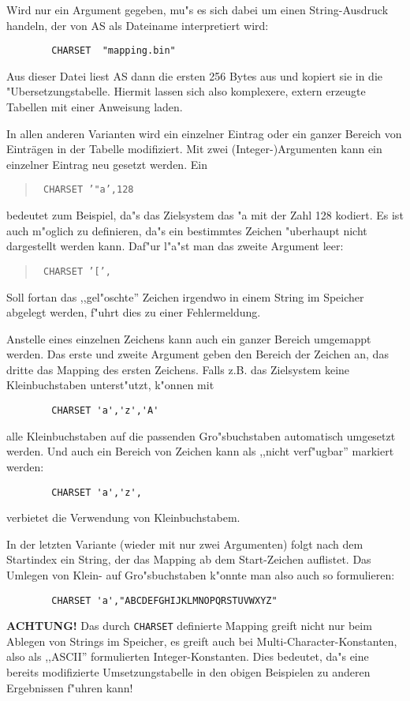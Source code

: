 \documentclass[12pt,a4paper,twoside]{report}
\newcommand{\bb}[1]{{\bf #1}}
\newcommand{\tty}[1]{{\tt #1}}
\begin{document}
Wird nur ein Argument gegeben, mu"s es sich dabei um einen String-Ausdruck
handeln, der von AS als Dateiname interpretiert wird:
\begin{verbatim}
        CHARSET  "mapping.bin"
\end{verbatim}
Aus dieser Datei liest AS dann die ersten 256 Bytes aus und kopiert sie in die
"Ubersetzungstabelle.  Hiermit lassen sich also komplexere, extern
erzeugte Tabellen mit einer Anweisung laden.

In allen anderen Varianten wird ein einzelner Eintrag oder ein ganzer
Bereich von Einträgen in der Tabelle modifiziert.  Mit zwei (Integer-)Argumenten
kann ein einzelner Eintrag neu gesetzt werden.  Ein
\begin{quote}{\tt
        CHARSET '"a',128
}\end{quote}
bedeutet zum Beispiel, da"s das Zielsystem das "a mit der Zahl 128 kodiert.
Es ist auch m"oglich zu definieren, da"s ein bestimmtes Zeichen "uberhaupt
nicht dargestellt werden kann.  Daf"ur l"a"st man das zweite Argument leer:
\begin{quote}{\tt
        CHARSET '[',
}\end{quote}
Soll fortan das ,,gel"oschte'' Zeichen irgendwo in einem String im Speicher
abgelegt werden, f"uhrt dies zu einer Fehlermeldung.

Anstelle eines einzelnen Zeichens kann auch ein ganzer Bereich umgemappt
werden.  Das erste und zweite Argument geben den Bereich der Zeichen an, das
dritte das Mapping des ersten Zeichens.  Falls z.B. das Zielsystem keine
Kleinbuchstaben unterst"utzt, k"onnen mit
\begin{verbatim}
        CHARSET 'a','z','A'
\end{verbatim}
alle Kleinbuchstaben auf die passenden Gro"sbuchstaben automatisch
umgesetzt werden.  Und auch ein Bereich von Zeichen kann als
,,nicht verf"ugbar'' markiert werden:
\begin{verbatim}
        CHARSET 'a','z',
\end{verbatim}
verbietet die Verwendung von Kleinbuchstabem.

In der letzten Variante (wieder mit nur zwei Argumenten) folgt nach dem
Startindex ein String, der das Mapping ab dem Start-Zeichen auflistet.
Das Umlegen von Klein- auf Gro"sbuchstaben k"onnte man also auch so
formulieren:
\begin{verbatim}
        CHARSET 'a',"ABCDEFGHIJKLMNOPQRSTUVWXYZ"
\end{verbatim}

\bb{ACHTUNG!} Das durch \tty{CHARSET} definierte Mapping greift nicht nur
beim Ablegen von Strings im Speicher, es greift auch bei Multi-Character-Konstanten,
also als ,,ASCII'' formulierten Integer-Konstanten.  Dies bedeutet, da"s
eine bereits modifizierte Umsetzungstabelle in den obigen Beispielen zu
anderen Ergebnissen f"uhren kann!
\end{document}
